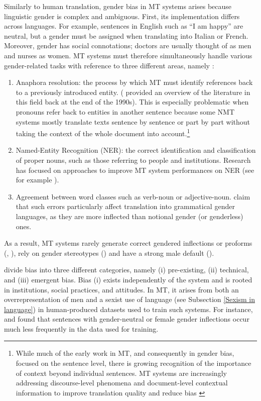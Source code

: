 Similarly to human translation, gender bias in MT systems arises because linguistic gender is complex and ambiguous. First, its implementation differs across languages. For example, sentences in English such as ``I am happy'' are neutral, but a gender must be assigned when translating into Italian or French. Moreover, gender has social connotations; doctors are usually thought of as men and nurses as women. MT systems must therefore simultaneously handle various gender-related tasks with reference to three different areas, namely \citep[457]{monti2020gender}:
\begin{enumerate}
\setlength\itemsep{-0.5em}
    \item Anaphora resolution: the process by which MT must identify references back to a previously introduced entity. (\textcite{mitkov1999special} provided an overview of the literature in this field back at the end of the 1990s). This is especially problematic when pronouns refer back to entities in another sentence because some NMT systems mostly translate texts sentence by sentence or part by part without taking the context of the whole document into account.\footnote{While much of the early work in MT, and consequently in gender bias, focused on the sentence level, there is growing recognition of the importance of context beyond individual sentences. MT systems are increasingly addressing discourse-level phenomena and document-level contextual information to improve translation quality and reduce bias \citep{jin-etal-2023-challenges}}
    \item Named-Entity Recognition (NER): the correct identification and classification of proper nouns, such as those referring to people and institutions. Research has focused on approaches to improve MT system performances on NER (see for example \cite{babych-hartley-2003-improving}).
    \item Agreement between word classes such as verb-noun or adjective-noun. \textcite{saunders2020reducing} claim that such errors particularly affect translation into grammatical gender languages, as they are more inflected than notional gender (or genderless) ones. 
\end{enumerate}
As a result, MT systems rarely generate correct gendered inflections or proforms (\cite{sun2019mitigating}, \cite[457]{monti2020gender}), rely on gender stereotypes (\cite{prates2019assessing}) and have a strong male default (\cite[457]{monti2020gender}). 

\textcite[333]{Friedman1996bias} divide bias into three different categories, namely (i) pre-existing, (ii) technical, and (iii) emergent bias. Bias (i) exists independently of the system and is rooted in institutions, social practices, and attitudes. In MT, it arises from both an overrepresentation of men and a sexist use of language (see Subsection \ref{Sexism in language}) in human-produced datasets used to train such systems. For instance, \textcite{vanmassenhove2019getting} and \textcite{choubey2021improving} found that sentences with gender-neutral or female gender inflections occur much less frequently in the data used for training. 

